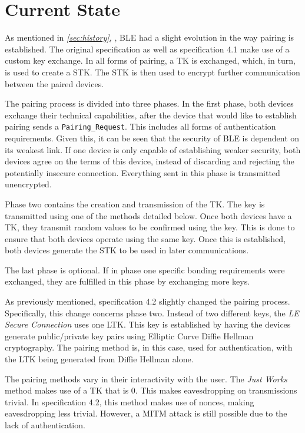 \section{Current State}
\label{sec:state}

As mentioned in \textit{\ref{sec:history}, }, \ac{BLE} had a slight evolution in the way pairing is established. The original specification as well as specification 4.1 make use of a custom key exchange. In all forms of pairing, a \ac{TK} is exchanged, which, in turn, is used to create a \ac{STK}. The \ac{STK} is then used to encrypt further communication between the paired devices.

The pairing process is divided into three phases. In the first phase, both devices exchange their technical capabilities, after the device that would like to establish pairing sends a \texttt{Pairing\_Request}. This includes all forms of authentication requirements. Given this, it can be seen that the security of \ac{BLE} is dependent on its weakest link. If one device is only capable of establishing weaker security, both devices agree on the terms of this device, instead of discarding and rejecting the potentially insecure connection. Everything sent in this phase is transmitted unencrypted.

Phase two contains the creation and transmission of the \ac{TK}. The key is transmitted using one of the methods detailed below. Once both devices have a \ac{TK}, they transmit random values to be confirmed using the key. This is done to ensure that both devices operate using the same key. Once this is established, both devices generate the \ac{STK} to be used in later communications.

The last phase is optional. If in phase one specific bonding requirements were exchanged, they are fulfilled in this phase by exchanging more keys.

As previously mentioned, specification 4.2 slightly changed the pairing process. Specifically, this change concerns phase two. Instead of two different keys, the \textit{LE Secure Connection} uses one \ac{LTK}. This key is established by having the devices generate public/private key pairs using Elliptic Curve Diffie Hellman cryptography. The pairing method is, in this case, used for authentication, with the \ac{LTK} being generated from Diffie Hellman alone.

The pairing methods vary in their interactivity with the user. The \textit{Just Works} method makes use of a \ac{TK} that is 0. This makes eavesdropping on transmissions trivial. In specification 4.2, this method makes use of nonces, making eavesdropping less trivial. However, a MITM attack is still possible due to the lack of authentication.

